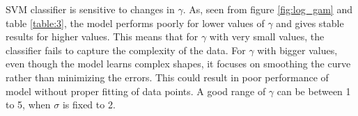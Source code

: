 {SVM classifier is sensitive to changes in $\gamma$. As, seen from figure \ref{fig:log_gam} and table \ref{table:3}, the model performs poorly for lower values of $\gamma$ and gives stable results for higher values. This means that for $\gamma$ with very small values, the classifier fails to capture the complexity of the data. For $\gamma$ with bigger values, even though the model learns complex shapes, it focuses on smoothing the curve rather than minimizing the errors. This could result in poor performance of model without proper fitting of data points. A good range of $\gamma$ can be between 1 to 5, when $\sigma$ is fixed to 2.
 \begin{figure}[!ht]
 	\begin{floatrow}
\end{floatrow}
\end{figure}}
